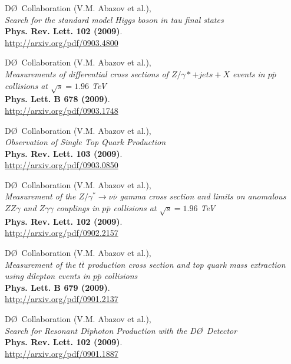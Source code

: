 \documentclass[12pt]{article}
\begin{document}
%
D\O~Collaboration (V.M. Abazov et al.), \\
\textsl{Search for the standard model Higgs boson in tau final states}\\
\textbf{Phys. Rev. Lett. 102 (2009)}.\\
{\small{\url{http://arxiv.org/pdf/0903.4800}}}\vspace{4mm}

%
D\O~Collaboration (V.M. Abazov et al.), \\
\textsl{Measurements of differential cross sections of $Z/\gamma*+jets+X$ events in $p\overline{p}$ collisions at $\sqrt{s}=1.96$ TeV}\\
\textbf{Phys. Lett. B 678 (2009)}.\\
{\small{\url{http://arxiv.org/pdf/0903.1748}}}\vspace{4mm}

%
D\O~Collaboration (V.M. Abazov et al.), \\
\textsl{Observation of Single Top Quark Production}\\
\textbf{Phys. Rev. Lett. 103 (2009)}.\\
{\small{\url{http://arxiv.org/pdf/0903.0850}}}\vspace{4mm}

%
D\O~Collaboration (V.M. Abazov et al.), \\
\textsl{Measurement of the $Z/\gamma^*\rightarrow\nu\overline{\nu}$ gamma cross section and limits on anomalous $Z Z \gamma$ and $Z\gamma\gamma$ couplings in $p\overline{p}$ collisions at $\sqrt{s}=1.96$ TeV}\\
\textbf{Phys. Rev. Lett. 102 (2009)}.\\
{\small{\url{http://arxiv.org/pdf/0902.2157}}}\vspace{4mm}

%
D\O~Collaboration (V.M. Abazov et al.), \\
\textsl{Measurement of the $t\overline{t}$ production cross section and top quark mass extraction using dilepton events in $p\overline{p}$ collisions}\\
\textbf{Phys. Lett. B 679 (2009)}.\\
{\small{\url{http://arxiv.org/pdf/0901.2137}}}\vspace{4mm}

%
D\O~Collaboration (V.M. Abazov et al.), \\
\textsl{Search for Resonant Diphoton Production with the D\O~Detector}\\
\textbf{Phys. Rev. Lett. 102 (2009)}.\\
{\small{\url{http://arxiv.org/pdf/0901.1887}}}\vspace{4mm}
\end{document}
